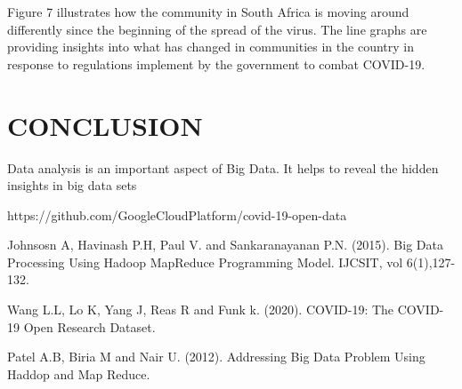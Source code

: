 \documentclass[12pt]{article}
\begin{document}
Figure 7 illustrates how the community in South Africa is moving around differently since the beginning of the spread of the virus. The line graphs are providing insights into what has changed in communities in the country in response to regulations implement by the government to combat COVID-19. 

\section{CONCLUSION}
Data analysis is an important aspect of Big Data. It helps to reveal the hidden insights in big data sets

\begin{thebibliography}{11}
https://github.com/GoogleCloudPlatform/covid-19-open-data

Johnsosn A, Havinash P.H, Paul V. and Sankaranayanan P.N. (2015). Big Data Processing Using Hadoop MapReduce Programming Model. IJCSIT, vol 6(1),127-132.

Wang L.L, Lo K, Yang J, Reas R and Funk k. (2020). COVID-19: The COVID-19 Open Research Dataset.

Patel A.B, Biria M and Nair U. (2012). Addressing Big Data Problem Using Haddop and Map Reduce.

\end{thebibliography}
\end{document}
